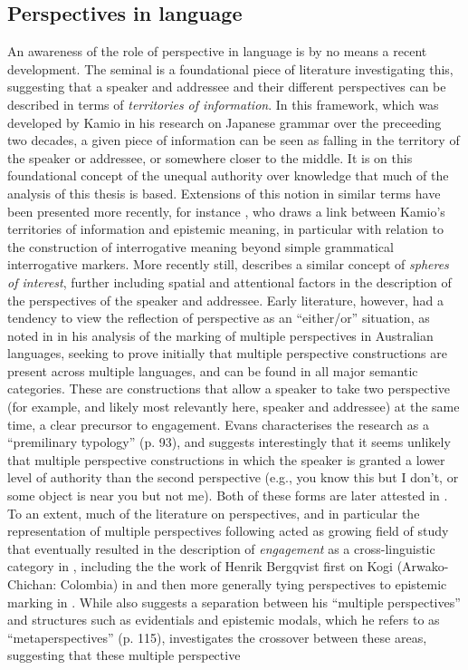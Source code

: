 \subsection{Perspectives in language}
An awareness of the role of perspective in language is by no means a recent development. The seminal  is a foundational piece of literature investigating this, suggesting that a speaker and addressee and their different perspectives can be described in terms of \textit{territories of information}. In this framework, which was developed by Kamio in his research on Japanese grammar over the preceeding two decades, a given piece of information can be seen as falling in the territory of the speaker or addressee, or somewhere closer to the middle. It is on this foundational concept of the unequal authority over knowledge that much of the analysis of this thesis is based. Extensions of this notion in similar terms have been presented more recently, for instance , who draws a link between Kamio's territories of information and epistemic meaning, in particular with relation to the construction of interrogative meaning beyond simple grammatical interrogative markers. More recently still,  describes a similar concept of \textit{spheres of interest}, further including spatial and attentional factors in the description of the perspectives of the speaker and addressee. Early literature, however, had a tendency to view the reflection of perspective as an ``either/or'' situation, as noted in  in his analysis of the marking of multiple perspectives in Australian languages, seeking to prove initially that multiple perspective constructions are present across multiple languages, and can be found in all major semantic categories. These are constructions that allow a speaker to take two perspective (for example, and likely most relevantly here, speaker and addressee) at the same time, a clear precursor to engagement. Evans characterises the research as a ``premilinary typology'' (p. 93), and suggests interestingly that it seems unlikely that multiple perspective constructions in which the speaker is granted a lower level of authority than the second perspective (e.g., you know this but I don't, or some object is near you but not me). Both of these forms are later attested in . To an extent, much of the literature on perspectives, and in particular the representation of multiple perspectives following  acted as growing field of study that eventually resulted in the description of \textit{engagement} as a cross-linguistic category in , including the the work of Henrik Bergqvist first on Kogi (Arwako-Chichan: Colombia) in  and then more generally tying perspectives to epistemic marking in . While  also suggests a separation between his ``multiple perspectives'' and structures such as evidentials and epistemic modals, which he refers to as ``metaperspectives'' (p. 115),  investigates the crossover between these areas, suggesting that these multiple perspective 